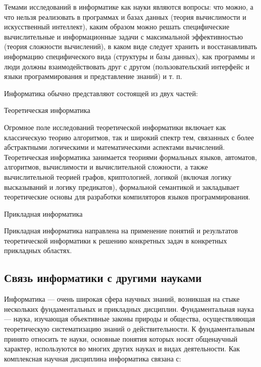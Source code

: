 \documentclass[a4paper]{article}
\begin{document}
Темами исследований в информатике как науки являются вопросы: что можно, а что нельзя реализовать в программах и базах данных (теория вычислимости и искусственный интеллект), каким образом можно решать специфические вычислительные и информационные задачи с максимальной эффективностью (теория сложности вычислений), в каком виде следует хранить и восстанавливать информацию специфического вида (структуры и базы данных), как программы и люди должны взаимодействовать друг с другом (пользовательский интерфейс и языки программирования и представление знаний) и т. п.

Информатика обычно представляют состоящей из двух частей:

Теоретическая информатика

Огромное поле исследований теоретической информатики включает как классическую теорию алгоритмов, так и широкий спектр тем, связанных с более абстрактными логическими и математическими аспектами вычислений. Теоретическая информатика занимается теориями формальных языков, автоматов, алгоритмов, вычислимости и вычислительной сложности, а также вычислительной теорией графов, криптологией, логикой (включая логику высказываний и логику предикатов), формальной семантикой и закладывает теоретические основы для разработки компиляторов языков программирования.

Прикладная информатика

Прикладная информатика направлена на применение понятий и результатов теоретической информатики к решению конкретных задач в конкретных прикладных областях.

\subsection{Связь информатики с другими науками}

Информатика — очень широкая сфера научных знаний, возникшая на стыке нескольких фундаментальных и прикладных дисциплин. Фундаментальная наука — наука, изучающая объективные законы природы и общества, осуществляющая теоретическую систематизацию знаний о действительности. К фундаментальным принято относить те науки, основные понятия которых носят общенаучный характер, используются во многих других науках и видах деятельности. Как комплексная научная дисциплина информатика связана с:
\end{document}
